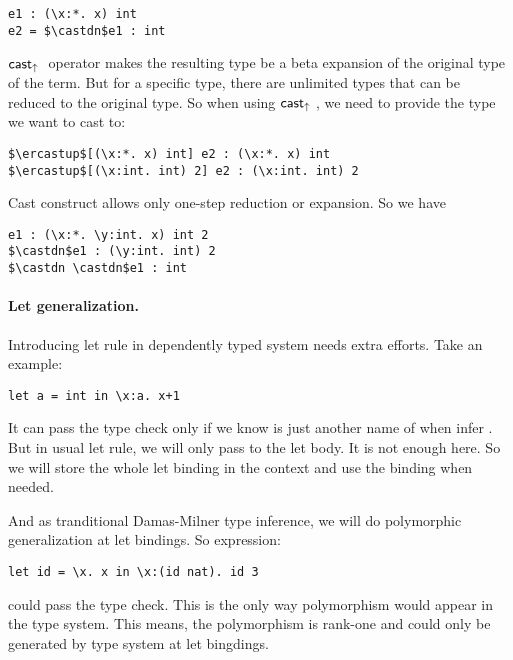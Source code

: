 \begin{lstlisting}
e1 : (\x:*. x) int
e2 = $\castdn$e1 : int
\end{lstlisting}

$\mathsf{cast}_\uparrow~$ operator makes the resulting type be a beta expansion of the original type of the term. But for a specific type, there are unlimited types that can be reduced to the original type. So when using $\mathsf{cast}_\uparrow~$, we need to provide the type we want to cast to:

\begin{lstlisting}
$\ercastup$[(\x:*. x) int] e2 : (\x:*. x) int
$\ercastup$[(\x:int. int) 2] e2 : (\x:int. int) 2
\end{lstlisting}

Cast construct allows only one-step reduction or expansion. So we have

\begin{lstlisting}
e1 : (\x:*. \y:int. x) int 2
$\castdn$e1 : (\y:int. int) 2
$\castdn \castdn$e1 : int
\end{lstlisting}

\paragraph{Let generalization.} Introducing let rule in dependently typed system needs extra efforts. Take an example:

\begin{lstlisting}
let a = int in \x:a. x+1
\end{lstlisting}

It can pass the type check only if we know  is just another name of  when infer . But in usual let rule, we will only pass  to the let body. It is not enough here. So we will store the whole let binding  in the context and use the binding when needed.

And as tranditional Damas-Milner type inference, we will do polymorphic generalization at let bindings. So expression:

\begin{lstlisting}
let id = \x. x in \x:(id nat). id 3
\end{lstlisting}

could pass the type check. This is the only way polymorphism would appear in the type system. This means, the polymorphism is rank-one and could only be generated by type system at let bingdings.

